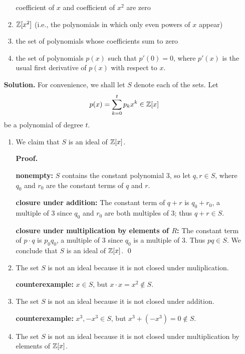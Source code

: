 \begin{enumerate}
\begin{enumerate}
                           coefficient of $x$ and coefficient of $x^2$ are zero
                     \item $\mathbb{Z}[x^2]$ (i.e., the polynomials in which only even
                           powers of $x$ appear)
                     \item the set of polynomials whose coefficients sum to
                           zero
                     \item the set of polynomials $p(x)$ such that $p'(0) = 0$,
                           where $p'(x)$ is the usual first derivative of $p(x)$
                           with respect to $x$.
                  \end{enumerate}

      \textbf{Solution.} For convenience, we shall let $S$ denote each of the
      sets. Let
      $$p(x) = \sum_{k=0}^tp_kx^k \in \mathbb{Z}[x]$$
      be a polynomial of degree $t$.

      \begin{enumerate}
         \item We claim that $S$ is an ideal of $\mathbb{Z}[x]$.

               \textbf{Proof.} 

               \textbf{nonempty:} $S$ contains the constant polynomial 3, so let
               $q, r \in S$, where $q_0$ and $r_0$ are the constant terms of $q$
               and $r$. 

               \textbf{closure under addition:} The constant
               term of $q + r$ is $q_0 + r_0$, a multiple of 3 since $q_0$ and
               $r_0$ are both multiples of 3; thus $q + r \in S$.

               \textbf{closure under multiplication by elements of $R$:} The
               constant term of $p \cdot q$ is $p_0q_0$, a multiple of 3 since
               $q_0$ is a multiple of 3. Thus $pq \in S$. We conclude that $S$
               is an ideal of $\mathbb{Z}[x]$. \qed
         \item The set $S$ is not an ideal because it is not closed under
               muliplication.

               \textbf{counterexample:} $x \in S$, but
               $x \cdot x = x^2 \notin S$.
         \item The set $S$ is not an ideal because it is not closed under
               addition.

               \textbf{counterexample:} $x^3, -x^3 \in S$, but
               $x^3 + (-x^3) = 0 \notin S$.
         \item The set $S$ is not an ideal because it is not closed under
               multiplication by elements of $\mathbb{Z}[x]$.


\end{enumerate}
\end{enumerate}
